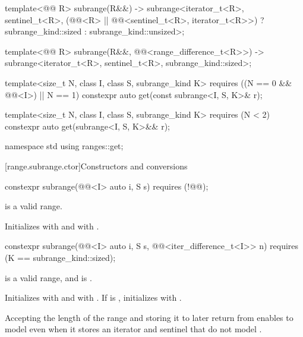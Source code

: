 \begin{codeblock}
{  template<@@ R>
    subrange(R&&) ->
      subrange<iterator_t<R>, sentinel_t<R>,
               (@@<R> || @@<sentinel_t<R>, iterator_t<R>>)
                 ? subrange_kind::sized : subrange_kind::unsized>;

  template<@@ R>
    subrange(R&&, @@<range_difference_t<R>>) ->
      subrange<iterator_t<R>, sentinel_t<R>, subrange_kind::sized>;

  template<size_t N, class I, class S, subrange_kind K>
    requires ((N == 0 && @@<I>) || N == 1)
    constexpr auto get(const subrange<I, S, K>& r);

  template<size_t N, class I, class S, subrange_kind K>
    requires (N < 2)
    constexpr auto get(subrange<I, S, K>&& r);
}

namespace std {
  using ranges::get;
}
\end{codeblock}

[range.subrange.ctor]{Constructors and conversions}

%
\begin{itemdecl}
constexpr subrange(@@<I> auto i, S s) requires (!@@);
\end{itemdecl}

\begin{itemdescr}
\pnum
\expects
{} is a valid range.

\pnum
\effects
Initializes  with  and  with
.
\end{itemdescr}

%
\begin{itemdecl}
constexpr subrange(@@<I> auto i, S s,
                   @@<iter_difference_t<I>> n)
  requires (K == subrange_kind::sized);
\end{itemdecl}

\begin{itemdescr}
\pnum
\expects
{} is a valid range, and
is .

\pnum
\effects
Initializes  with  and  with
. If  is , initializes  with
.

\pnum
\begin{note}
Accepting the length of the range and storing it to later return  from
 enables  to model  even
when it stores an iterator and sentinel that do not model
.
\end{note}
\end{itemdescr}

